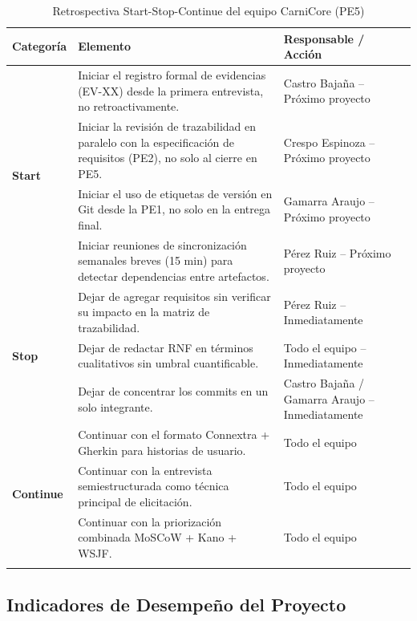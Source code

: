 \documentclass[11pt,a4paper]{article}
\begin{document}
\begin{longtable}{|p{2.5cm}|p{8cm}|p{3cm}|}
\hline
\textbf{Categoría} & \textbf{Elemento} & \textbf{Responsable / Acción} \\
\hline
\multirow{4}{*}{\textbf{Start}} &
Iniciar el registro formal de evidencias (EV-XX) desde la primera entrevista, no retroactivamente. & Castro Bajaña -- Próximo proyecto \\
\cline{2-3}
& Iniciar la revisión de trazabilidad en paralelo con la especificación de requisitos (PE2), no solo al cierre en PE5. & Crespo Espinoza -- Próximo proyecto \\
\cline{2-3}
& Iniciar el uso de etiquetas de versión en Git desde la PE1, no solo en la entrega final. & Gamarra Araujo -- Próximo proyecto \\
\cline{2-3}
& Iniciar reuniones de sincronización semanales breves (15 min) para detectar dependencias entre artefactos. & Pérez Ruiz -- Próximo proyecto \\
\hline
\multirow{3}{*}{\textbf{Stop}} &
Dejar de agregar requisitos sin verificar su impacto en la matriz de trazabilidad. & Pérez Ruiz -- Inmediatamente \\
\cline{2-3}
& Dejar de redactar RNF en términos cualitativos sin umbral cuantificable. & Todo el equipo -- Inmediatamente \\
\cline{2-3}
& Dejar de concentrar los commits en un solo integrante. & Castro Bajaña / Gamarra Araujo -- Inmediatamente \\
\hline
\multirow{3}{*}{\textbf{Continue}} &
Continuar con el formato Connextra + Gherkin para historias de usuario. & Todo el equipo \\
\cline{2-3}
& Continuar con la entrevista semiestructurada como técnica principal de elicitación. & Todo el equipo \\
\cline{2-3}
& Continuar con la priorización combinada MoSCoW + Kano + WSJF. & Todo el equipo \\
\hline
\caption{Retrospectiva Start-Stop-Continue del equipo CarniCore (PE5)}
\label{tab:retrospectiva}
\end{longtable}

\subsection{Indicadores de Desempeño del Proyecto}
\end{document}
